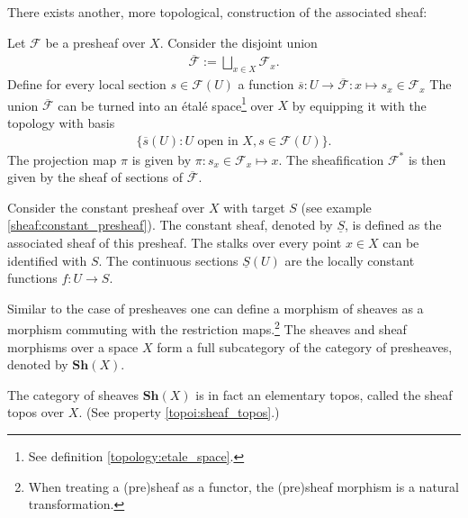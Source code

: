     There exists another, more topological, construction of the associated sheaf:
    \begin{construct}\label{sheaf:etale_construction}
        Let $\mathcal{F}$ be a presheaf over $X$. Consider the disjoint union
        \begin{gather}
            \overline{\mathcal{F}} := \bigsqcup_{x\in X}\mathcal{F}_x.
        \end{gather}
        Define for every local section $s\in\mathcal{F}(U)$ a function $\overline{s}:U\rightarrow\overline{\mathcal{F}}:x\mapsto s_x\in\mathcal{F}_x$ The union $\overline{\mathcal{F}}$ can be turned into an \'etal\'e space\footnote{See definition \ref{topology:etale_space}.} over $X$ by equipping it with the topology with basis
        \begin{gather}
            \big\{\overline{s}(U):U\text{ open in }X, s\in\mathcal{F}(U)\big\}.
        \end{gather}
        The projection map $\pi$ is given by $\pi:s_x\in\mathcal{F}_x\mapsto x$. The sheafification $\mathcal{F}^\ast$ is then given by the sheaf of sections of $\overline{\mathcal{F}}$.
    \end{construct}

    \begin{example}\label{sheaf:constant_sheaf}
        Consider the constant presheaf over $X$ with target $S$ (see example \ref{sheaf:constant_presheaf}). The constant sheaf, denoted by $\underline{S}$, is defined as the associated sheaf of this presheaf. The stalks over every point $x\in X$ can be identified with $S$. The continuous sections $\underline{S}(U)$ are the locally constant functions $f:U\rightarrow S$.
    \end{example}

    \begin{notation}
        Similar to the case of presheaves one can define a morphism of sheaves as a morphism commuting with the restriction maps.\footnote{When treating a (pre)sheaf as a functor, the (pre)sheaf morphism is a natural transformation.} The sheaves and sheaf morphisms over a space $X$ form a full subcategory of the category of presheaves, denoted by $\mathbf{Sh}(X)$.
    \end{notation}

    \begin{property}
        The category of sheaves $\mathbf{Sh}(X)$ is in fact an elementary topos, called the sheaf topos over $X$. (See property \ref{topoi:sheaf_topos}.)
    \end{property}

